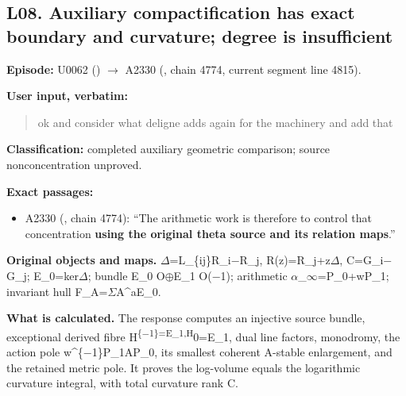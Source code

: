 \subsection{L08. Auxiliary compactification has exact boundary and
curvature; degree is
insufficient}\label{TranscriptLedgerStage:l08.-auxiliary-compactification-has-exact-boundary-and-curvature-degree-is-insufficient}

\textbf{Episode:} U0062
(\protect{})
\allowbreak{}\ensuremath{→}\allowbreak{} A2330
(\protect{}, chain 4774,
current segment line 4815).

\textbf{User input, verbatim:}

\begin{quote}
ok and consider what deligne adds again for the machinery and add that
\end{quote}

\textbf{Classification:} completed auxiliary geometric comparison;
source nonconcentration unproved.

\textbf{Exact passages:}

\begin{itemize}
\tightlist
\item
  A2330 (\protect{}, chain
  4774): ``The arithmetic work is therefore to control that
  concentration \textbf{using the original theta source and its relation
  maps}.''
\end{itemize}

\textbf{Original objects and maps.}
\allowbreak{}\ensuremath{Δ}\allowbreak{}=L\_\{ij\}R\_i\allowbreak{}\ensuremath{−}\allowbreak{}R\_j,
R(z)=R\_j+z\allowbreak{}\ensuremath{Δ}\allowbreak{},
C=G\_i\allowbreak{}\ensuremath{−}\allowbreak{}G\_j;
E\_0=ker\allowbreak{}\ensuremath{Δ}\allowbreak{}; bundle E\_0
O\allowbreak{}\ensuremath{⊕}\allowbreak{}E\_1
O(\allowbreak{}\ensuremath{−}\allowbreak{}1); arithmetic
\allowbreak{}\ensuremath{α}\allowbreak{}\_\allowbreak{}\ensuremath{∞}\allowbreak{}=P\_0+wP\_1;
invariant hull
F\_A=\allowbreak{}\ensuremath{Σ}\allowbreak{}A\textasciicircum{}aE\_0.

\textbf{What is calculated.} The response computes an injective source
bundle, exceptional derived fibre
H\textsuperscript{\{\allowbreak{}\ensuremath{−}\allowbreak{}1\}=E\_1,H}0=E\_1,
dual line factors, monodromy, the action pole
w\textasciicircum{}\{\allowbreak{}\ensuremath{−}\allowbreak{}1\}P\_1AP\_0,
its smallest coherent A-stable enlargement, and the retained metric
pole. It proves the log-volume equals the logarithmic curvature
integral, with total curvature rank C.

